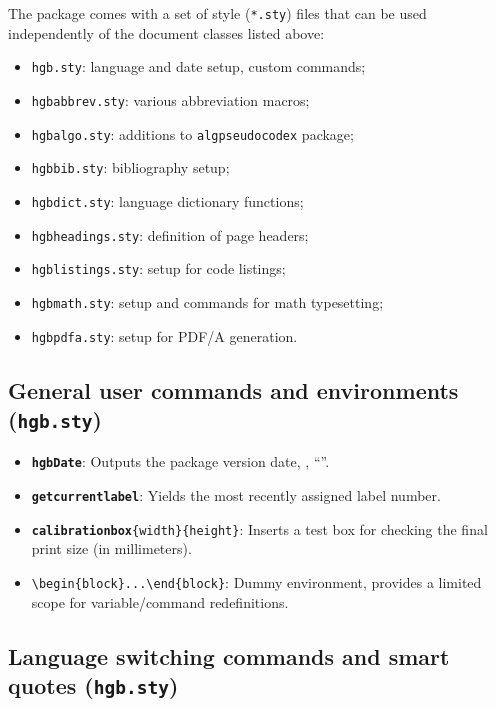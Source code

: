 \documentclass[english]{hgbarticle}
\begin{document}
The package comes with a set of style (\texttt{*.sty}) files that can be used
independently of the document classes listed above:
\begin{itemize}
  \item \texttt{hgb.sty}: language and date setup, custom commands;
  \item \texttt{hgbabbrev.sty}: various abbreviation macros;
  \item \texttt{hgbalgo.sty}: additions to \texttt{algpseudocodex} package;
  \item \texttt{hgbbib.sty}: bibliography setup;
  \item \texttt{hgbdict.sty}: language dictionary functions;
  \item \texttt{hgbheadings.sty}: definition of page headers;
  \item \texttt{hgblistings.sty}: setup for code listings;
  \item \texttt{hgbmath.sty}: setup and commands for math typesetting;
  \item \texttt{hgbpdfa.sty}: setup for PDF/A generation.
\end{itemize}

\subsection{General user commands and environments (\texttt{hgb.sty})}
\label{sec:GeneralUserCommands}

\begin{itemize}
   \item \textbf{\texttt{{\bs}hgbDate}}: Outputs the package version date,
    \eg, ``\texttt{\hgbDate}''.
	\item \textbf{\texttt{{\bs}getcurrentlabel}}:
			Yields the most recently assigned label number.
   \item \textbf{\texttt{{\bs}calibrationbox}}\verb!{width}{height}!:
			Inserts a test box for checking the final print size (in millimeters).
	\item \verb!\begin{block}...\end{block}!:
			Dummy environment, provides a limited scope for variable/command redefinitions.
\end{itemize}


\subsection{Language switching commands and smart quotes (\texttt{hgb.sty})}
\label{sec:LanguageSwitchingCommands}
\end{document}
